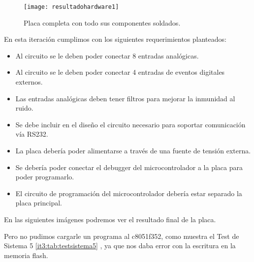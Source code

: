 \begin{figure}[h]
  \centering
  \texttt{[image: resultadohardware1]}
  \caption{Placa completa con todo sus componentes soldados.}\label{fig:resultadohardware1}
\end{figure}

En esta iteración cumplimos con los siguientes requerimientos planteados:
\begin{itemize}
  \item Al circuito se le deben poder conectar 8 entradas analógicas.
  \item Al circuito se le deben poder conectar 4 entradas de eventos digitales externos.
  \item Las entradas analógicas deben tener filtros para mejorar la inmunidad al ruido.
  \item Se debe incluir en el diseño el circuito necesario para soportar comunicación vía RS232.
  \item La placa debería poder alimentarse a través de una fuente de tensión externa.
  \item Se debería poder conectar el debugger del microcontrolador a la placa para poder programarlo.
  \item El circuito de programación del microcontrolador debería estar separado la placa principal.
\end{itemize}

En las siguientes imágenes podremos ver el resultado final de la placa.

Pero no pudimos cargarle un programa al c8051f352, como muestra el Test de Sistema 5 \ref{it3:tab:testsistema5} , ya que nos daba error con la escritura en la memoria flash.

